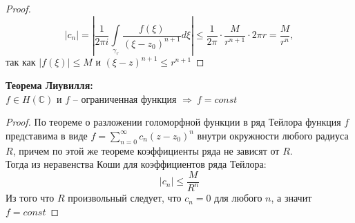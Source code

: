 \begin{proof}
	\ \\
	\begin{equation*}
		|c_n| = |\frac{1}{2 \pi i} \int \limits_{{\gamma}_r} \frac{f(\xi)}{(\xi - z_0)^{n+1}}d\xi| \leq \frac{1}{2 \pi} \cdot \frac{M}{r^{n+1}} \cdot 2 \pi r = \frac{M}{r^n},
	\end{equation*}
	так как $|f(\xi)| \leq M$ и $(\xi - z)^{n+1} \leq r^{n+1}$
\end{proof}


\textbf{Теорема Лиувилля:}\\[2mm]
$f \in H(\mathbb{C})$ и $f$ -- ограниченная функция $\Rightarrow \ f = const$ 


\begin{proof}
	По теореме о разложении голоморфной функции в ряд Тейлора 
	функция $f$ представима в виде $f = \sum_{n=0}^{\infty} c_n (z - z_0)^n$ внутри окружности любого радиуса $R$,
	причем по этой же теореме коэффициенты ряда не зависят от $R$.\\[2mm]
	Тогда из неравенства Коши для коэффициентов ряда Тейлора:
	$$
	|c_n| \leq \frac{M}{R^n}
	$$
	Из того что $R$ произвольный следует, что $c_n = 0$ для
	любого $n$, а значит $f = const$
\end{proof}

